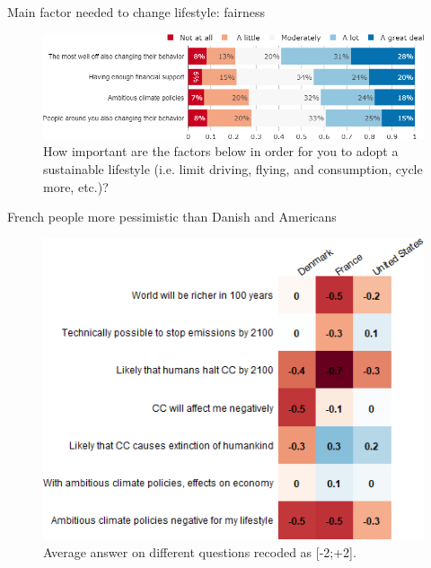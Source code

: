 \begin{framefont}{\small}
\begin{frame}{Main factor needed to change lifestyle: fairness}%
\begin{figure}[h!]
\centering
\caption{How important are the factors below in order for you to adopt a sustainable lifestyle (i.e. limit driving, flying, and consumption, cycle more, etc.)?}
\includegraphics[width=.87\paperwidth]{../figures/FR/condition_FR.png}
\end{figure}
\end{frame}


\begin{frame}{French people more pessimistic than Danish and Americans}%
\begin{figure}[h!]
\centering
\caption{Average answer on different questions recoded as [-2;+2].}
\includegraphics[height=.8\paperheight]{../figures/country_comparison/future_mean_countries.png}
\end{figure}
\end{frame}



\end{framefont}

